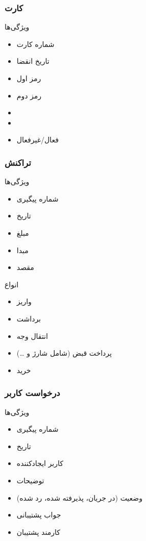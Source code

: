 \documentclass{article}
\begin{document}
        \subsubsection{کارت}
            ویژگی‌ها
            \begin{itemize}
                \item شماره کارت
                \item تاریخ انقضا
                \item رمز اول
                \item رمز دوم
                \item {}
                \item {}
                \item فعال/غیرفعال
            \end{itemize}

        \subsubsection{تراکنش}
            ویژگی‌ها
            \begin{itemize}
             \item شماره پیگیری
                \item تاریخ
                \item مبلغ
                \item مبدا
                \item مقصد
            \end{itemize}
            انواع
            \begin{itemize}
                \item واریز
                \item برداشت
                \item انتقال وجه
                \item پرداخت قبض (شامل شارژ و \dots)
                \item خرید
            \end{itemize}
            
        \subsubsection{درخواست کاربر}
            ویژگی‌ها
            \begin{itemize}
             \item شماره پیگیری
                \item تاریخ
                \item کاربر ایجادکننده
                \item توضیحات
                \item وضعیت (در جریان، پذیرفته شده، رد شده)
                \item جواب پشتیبانی
                \item کارمند پشتیبان
            \end{itemize}
\end{document}
